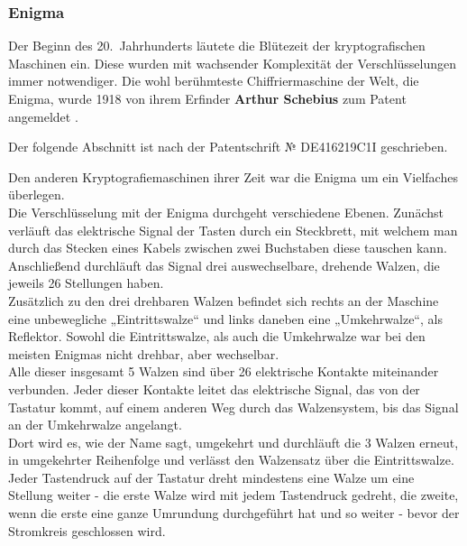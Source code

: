 \subsubsection{Enigma}
Der Beginn des 20.\ Jahrhunderts läutete die Blütezeit der kryptografischen Maschinen ein.
Diese wurden mit wachsender Komplexität der Verschlüsselungen immer notwendiger.
Die wohl berühmteste Chiffriermaschine der Welt, die Enigma, wurde 1918 von ihrem Erfinder \textbf{Arthur Schebius} zum Patent angemeldet \autocite{enigma_patent}.

Der folgende Abschnitt ist nach der Patentschrift № DE\nobreakdash416219C1\nobreakdash\RN{1} \autocite{enigma_patent} geschrieben.

Den anderen Kryptografiemaschinen ihrer Zeit war die Enigma um ein Vielfaches überlegen.\\
Die Verschlüsselung mit der Enigma durchgeht verschiedene Ebenen.
Zunächst verläuft das elektrische Signal der Tasten durch ein Steckbrett, mit welchem man durch das Stecken eines Kabels zwischen zwei Buchstaben diese tauschen kann.
Anschließend durchläuft das Signal drei auswechselbare, drehende Walzen, die jeweils 26 Stellungen haben.\\
Zusätzlich zu den drei drehbaren Walzen befindet sich rechts an der Maschine eine unbewegliche „Eintrittswalze“ und links daneben eine „Umkehrwalze“, als Reflektor.
Sowohl die Eintrittswalze, als auch die Umkehrwalze war bei den meisten Enigmas nicht drehbar, aber wechselbar.\\
Alle dieser insgesamt 5 Walzen sind über 26 elektrische Kontakte miteinander verbunden.
Jeder dieser Kontakte leitet das elektrische Signal, das von der Tastatur kommt, auf einem anderen Weg durch das Walzensystem, bis das Signal an der Umkehrwalze angelangt.\\
Dort wird es, wie der Name sagt, umgekehrt und durchläuft die 3 Walzen erneut, in umgekehrter Reihenfolge und verlässt den Walzensatz über die Eintrittswalze.
Jeder Tastendruck auf der Tastatur dreht mindestens eine Walze um eine Stellung weiter - die erste Walze wird mit jedem Tastendruck gedreht, die zweite, wenn die erste eine ganze Umrundung durchgeführt hat und so weiter - bevor der Stromkreis geschlossen wird. \autocite[]{enigma_patent}


